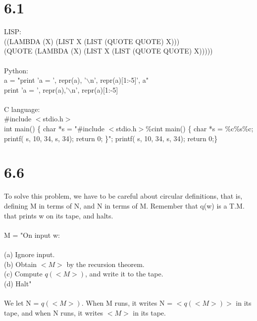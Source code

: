 \documentclass{scrartcl}
\begin{document}
\section*{6.1}
LISP:\\
((LAMBDA (X) (LIST X (LIST (QUOTE QUOTE) X)))\\
(QUOTE (LAMBDA (X) (LIST X (LIST (QUOTE QUOTE) X)))))
\\
\\
Python:\\
a = "print 'a = ', repr(a), '$\backslash$n', repr(a)[1:-5]', a"\\print 'a = ', repr(a),'$\backslash$n', repr(a)[1:-5] \\
\\
C language:\\
\#include $<$stdio.h$>$\\
int main() \{ char *s = "\#include $<$stdio.h$>$\%cint main() \{ char *s = \%c\%s\%c; printf( s, 10, 34, s, 34); return 0; \}"; printf( s, 10, 34, s, 34); return 0;\}




\section*{6.6}
To solve this problem, we have to be careful about circular definitions, that is, defining M in terms of N, and N in terms of M. Remember that q(w) is a T.M. that prints w on its tape, and halts.\\
\\
M = "On input w:\\
\\
(a) Ignore input.\\
(b) Obtain $<M>$ by the recursion theorem.\\
(c) Compute $q(<M>)$, and write it to the tape.\\
(d) Halt"\\
\\
We let N = $q(<M>)$. When M runs, it writes N = $<q(<M>)>$ in its tape, and when N runs, it writes $<M>$ in its tape.  
\end{document}
